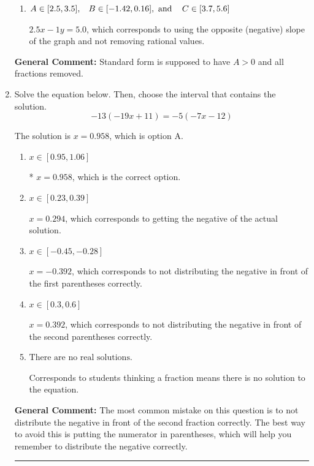 \documentclass{extbook}[14pt]
\newcommand{\litem}[1]{\item #1

\rule{\textwidth}{0.4pt}}
\begin{document}
\begin{enumerate}
{\begin{enumerate}[label=\Alph*.]
 $2.5x + 1y = -5.0$, which corresponds to not removing rational values for Standard Form.
\item \( A \in [2.5, 3.5], \hspace{3mm} B \in [-1.42, 0.16], \text{ and } \hspace{3mm} C \in [3.7, 5.6] \)

 $2.5x - 1y = 5.0$, which corresponds to using the opposite (negative) slope of the graph and not removing rational values.
\end{enumerate}

\textbf{General Comment:} Standard form is supposed to have $A > 0$ and all fractions removed.
}
\litem{
Solve the equation below. Then, choose the interval that contains the solution.
\[ -13(-19x + 11) = -5(-7x -12) \]

The solution is \( x = 0.958 \), which is option A.\begin{enumerate}[label=\Alph*.]
\item \( x \in [0.95, 1.06] \)

* $x = 0.958$, which is the correct option.
\item \( x \in [0.23, 0.39] \)

$x = 0.294$, which corresponds to getting the negative of the actual solution.
\item \( x \in [-0.45, -0.28] \)

$x = -0.392$, which corresponds to not distributing the negative in front of the first parentheses correctly.
\item \( x \in [0.3, 0.6] \)

$x = 0.392$, which corresponds to not distributing the negative in front of the second parentheses correctly.
\item \( \text{There are no real solutions.} \)

Corresponds to students thinking a fraction means there is no solution to the equation.
\end{enumerate}

\textbf{General Comment:} The most common mistake on this question is to not distribute the negative in front of the second fraction correctly. The best way to avoid this is putting the numerator in parentheses, which will help you remember to distribute the negative correctly.
}
\end{enumerate}
\end{document}
